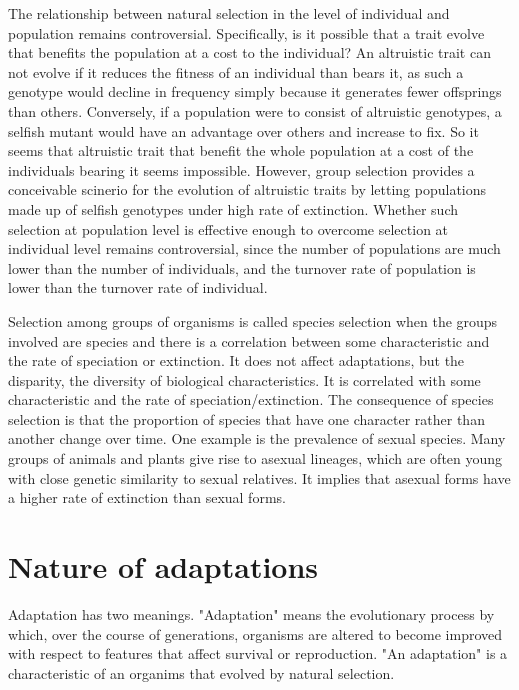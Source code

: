 \documentclass[11pt]{article}
\begin{document}
\begin{sloppypar}
The relationship between natural selection in the level of individual and population remains controversial. 
Specifically, is it possible that a trait evolve that benefits the population at a cost to the individual? 
An altruistic trait can not evolve if it reduces the fitness of an individual than bears it, as such a genotype would decline in frequency simply because it generates fewer offsprings than others. 
Conversely, if a population were to consist of altruistic genotypes, a selfish mutant would have an advantage over others and increase to fix. 
So it seems that altruistic trait that benefit the whole population at a cost of the individuals bearing it seems impossible. 
However, group selection provides a conceivable scinerio for the evolution of altruistic traits by letting populations made up of selfish genotypes under high rate of extinction. 
Whether such selection at population level is effective enough to overcome selection at individual level remains controversial, since the number of populations are much lower than the number of individuals, and the turnover rate of population is lower than the turnover rate of individual. 

\par

Selection among groups of organisms is called species selection when the groups involved are species and there is a correlation between some characteristic and the rate of speciation or extinction. 
It does not affect adaptations, but the disparity, the diversity of biological characteristics. 
It is correlated with some characteristic and the rate of speciation/extinction. 
The consequence of species selection is that the proportion of species that have one character rather than another change over time. 
One example is the prevalence of sexual species. 
Many groups of animals and plants give rise to asexual lineages, which are often young with close genetic similarity to sexual relatives. 
It implies that asexual forms have a higher rate of extinction than sexual forms. 

\section{Nature of adaptations}
Adaptation has two meanings. 
"Adaptation" means the evolutionary process by which, over the course of generations, organisms are altered to become improved with respect to features that affect survival or reproduction. 
"An adaptation" is a characteristic of an organims that evolved by natural selection. 


\end{sloppypar}
\end{document}
